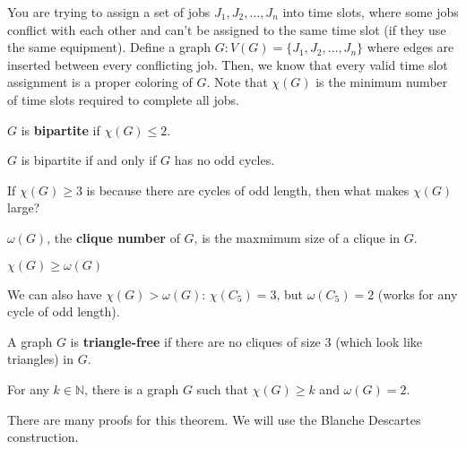 \begin{eg}
	You are trying to assign a set of jobs \( J_{1}, J_2, \ldots , J_n \) into time slots, where some jobs conflict with each other and can't be assigned to the same time slot (if they use the same equipment). Define a graph \( G \colon V(G) = \{J_{1}, J_{2},\ldots , J_n \}   \) where edges are inserted between every conflicting job. Then, we know that every valid time slot assignment is a proper coloring of \( G \). Note that \( \chi (G) \) is the minimum number of time slots required to complete all jobs.
\end{eg}

\begin{definition}
	\( G \) is \textbf{bipartite} if \( \chi(G) \le 2 \).
\end{definition}

\begin{theorem}
	\( G \) is bipartite if and only if \( G \) has no odd cycles.
\end{theorem}

If \( \chi(G) \ge 3 \) is because there are cycles of odd length, then what makes \( \chi (G) \) large?

\begin{definition}
	\( \omega(G) \), the \textbf{clique number} of \( G \), is the maxmimum size of a clique in \( G \).
\end{definition}

\begin{property}
	\( \chi(G) \ge \omega (G) \)
\end{property}

\begin{note}
	We can also have \( \chi(G) > \omega (G) \): \( \chi (C_5) = 3\), but \( \omega (C_5) = 2\) (works for any cycle of odd length).
\end{note}

\begin{definition}
	A graph \( G \) is \textbf{triangle-free} if there are no cliques of size 3 (which look like triangles) in \( G \).
\end{definition}

\begin{theorem}
	For any \( k \in \mathbb{N} \), there is a graph \( G \) such that \( \chi (G) \ge k \) and \( \omega (G) = 2 \).
\end{theorem}

There are many proofs for this theorem. We will use the Blanche Descartes construction.

